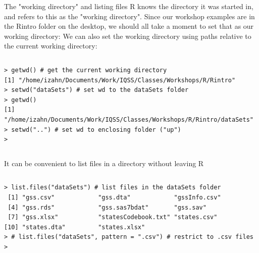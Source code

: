\documentclass[table,smaller]{beamer}
\begin{document}
\begin{frame}[fragile,label=sec-5-2]{The "working directory" and listing files}
  R knows the directory it was started in, and refers to this as the "working directory". Since our workshop examples are in the Rintro folder on the desktop, we should all take a moment to set that as our working directory:
We can also set the working directory using paths relative to the current working directory:

\vspace{-.5em}
\begin{columns}
\begin{block}{}
\begin{verbatim}
> getwd() # get the current working directory
[1] "/home/izahn/Documents/Work/IQSS/Classes/Workshops/R/Rintro"
> setwd("dataSets") # set wd to the dataSets folder
> getwd()
[1] "/home/izahn/Documents/Work/IQSS/Classes/Workshops/R/Rintro/dataSets"
> setwd("..") # set wd to enclosing folder ("up")
>
\end{verbatim}
\end{block}
\end{columns}
\vspace{.5em}

It can be convenient to list files in a directory without leaving R
\vspace{-.5em}
\begin{columns}
\begin{block}{}
\begin{verbatim}
> list.files("dataSets") # list files in the dataSets folder
 [1] "gss.csv"            "gss.dta"            "gssInfo.csv"       
 [4] "gss.rds"            "gss.sas7bdat"       "gss.sav"           
 [7] "gss.xlsx"           "statesCodebook.txt" "states.csv"        
[10] "states.dta"         "states.xlsx"       
> # list.files("dataSets", pattern = ".csv") # restrict to .csv files  
>
\end{verbatim}
\end{block}
\end{columns}
\vspace{.5em}
\end{frame}
\end{document}
